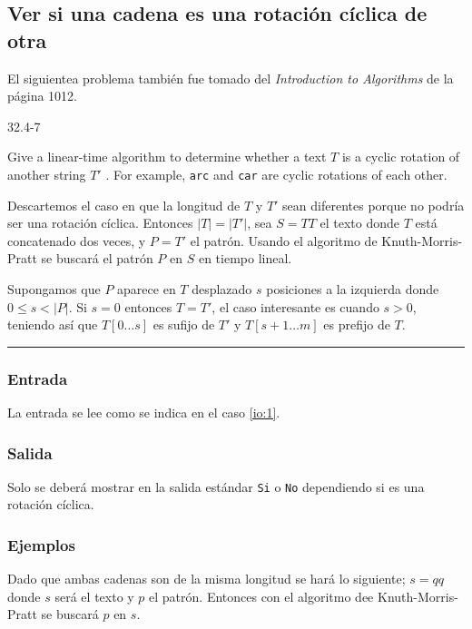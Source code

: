 \newpage


\subsection{Ver si una cadena es una rotación cíclica de otra}
El siguientea problema también fue tomado del \emph{Introduction to Algorithms}\cite{cormen_2009}
de la página 1012.
\begin{tcolorbox}
\hypertarget{cyclic_rotation}{32.4-7}
Give a linear-time algorithm to determine whether a text $T$ is a cyclic rotation of another string
$T'$ . For example, \texttt{arc} and \texttt{car} are cyclic rotations of each other.
\end{tcolorbox}

Descartemos el caso en que la longitud de $T$ y $T'$ sean diferentes porque no podría ser una
rotación cíclica. Entonces $\vert T \vert = \vert T' \vert$, sea $S = TT$ el texto donde $T$ está
concatenado dos veces, y $P = T'$ el patrón. Usando el algoritmo de Knuth-Morris-Pratt se buscará
el patrón $P$ en $S$ en tiempo lineal.

Supongamos que $P$ aparece en $T$ desplazado $s$ posiciones a la izquierda donde
$0 \leq s < \vert P \vert$. Si $s = 0$ entonces $T = T'$, el caso interesante es cuando $s > 0$,
teniendo así que $T[0 \ldots s]$ es sufijo de $T'$ y $T[s+1 \ldots m]$ es prefijo de $T$. 

\noindent\rule{\textwidth}{1pt}

\subsubsection{Entrada}
La entrada se lee como se indica en el caso \ref{io:1}.

\subsubsection{Salida}
Solo se deberá mostrar en la salida estándar \texttt{Si} o \texttt{No} dependiendo si es una
rotación cíclica.

\subsubsection{Ejemplos}
Dado que ambas cadenas son de la misma longitud se hará lo siguiente; $s = qq$ donde $s$ será el
texto y $p$ el patrón. Entonces con el algoritmo dee Knuth-Morris-Pratt se buscará $p$ en $s$.

